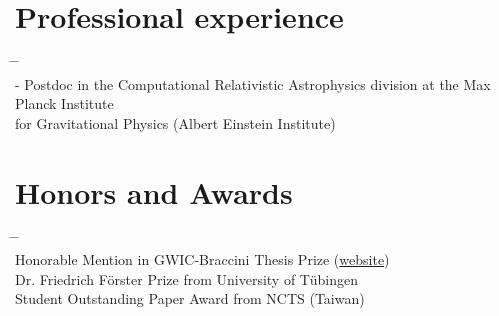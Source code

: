 \documentclass[10pt,floatfix,a4paper]{article}
\begin{document}
\section*{Professional experience}
\begin{tabbing}
  \hspace*{5mm} \= \hspace*{2.3cm} \= \hspace*{10cm} \\[-3ex]
   - \> Postdoc in the Computational Relativistic Astrophysics division at the Max Planck Institute \\
  \> \> for Gravitational Physics (Albert Einstein Institute)
\end{tabbing}


\section*{Honors and Awards}
\begin{tabbing}
  \hspace*{5mm} \= \hspace*{2.3cm} \= \hspace*{10cm} \\[-3ex]
  \> Honorable Mention in GWIC-Braccini Thesis Prize (\href{https://gwic.ligo.org/thesis-prize.html}{website}) \\
  \> Dr. Friedrich F{\"o}rster Prize from University of T{\"u}bingen \\
  \> Student Outstanding Paper Award from NCTS (Taiwan)
\end{tabbing}
\end{document}
